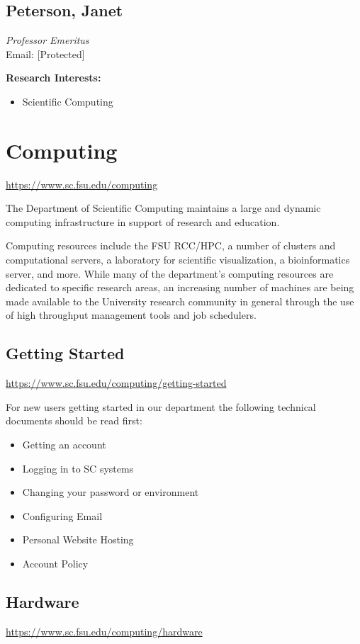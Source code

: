 \documentclass[12pt,a4paper]{article}
\begin{document}
\subsection{Peterson, Janet}
\textit{Professor Emeritus} \\
Email: [Protected]

\textbf{Research Interests:}
\begin{itemize}
    \item Scientific Computing
\end{itemize}

\section{Computing}
\url{https://www.sc.fsu.edu/computing}

The Department of Scientific Computing maintains a large and dynamic computing infrastructure in support of research and education.

Computing resources include the FSU RCC/HPC, a number of clusters and computational servers, a laboratory for scientific visualization, a bioinformatics server, and more. While many of the department's computing resources are dedicated to specific research areas, an increasing number of machines are being made available to the University research community in general through the use of high throughput management tools and job schedulers.

\subsection{Getting Started}
\url{https://www.sc.fsu.edu/computing/getting-started}

For new users getting started in our department the following technical documents should be read first:
\begin{itemize}
    \item Getting an account
    \item Logging in to SC systems
    \item Changing your password or environment
    \item Configuring Email
    \item Personal Website Hosting
    \item Account Policy
\end{itemize}

\subsection{Hardware}
\url{https://www.sc.fsu.edu/computing/hardware}
\end{document}
